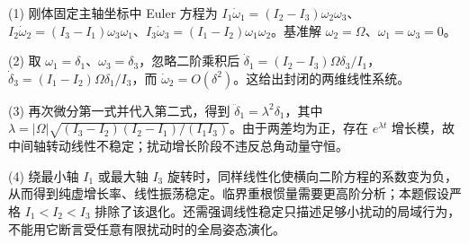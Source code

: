 (1) 刚体固定主轴坐标中 Euler 方程为 $I_1\dot\omega_1=(I_2-I_3)\omega_2\omega_3$、$I_2\dot\omega_2=(I_3-I_1)\omega_3\omega_1$、$I_3\dot\omega_3=(I_1-I_2)\omega_1\omega_2$。基准解 $\omega_2=\Omega$、$\omega_1=\omega_3=0$。

(2) 取 $\omega_1=\delta_1$、$\omega_3=\delta_3$，忽略二阶乘积后 $\dot\delta_1=(I_2-I_3)\Omega\delta_3/I_1$，$\dot\delta_3=(I_1-I_2)\Omega\delta_1/I_3$，而 $\dot\omega_2=O(\delta^2)$。这给出封闭的两维线性系统。

(3) 再次微分第一式并代入第二式，得到 $\ddot\delta_1=\lambda^2\delta_1$，其中 $\lambda=|\Omega|\sqrt{(I_3-I_2)(I_2-I_1)/(I_1I_3)}$。由于两差均为正，存在 $e^{\lambda t}$ 增长模，故中间轴转动线性不稳定；扰动增长阶段不违反总角动量守恒。

(4) 绕最小轴 $I_1$ 或最大轴 $I_3$ 旋转时，同样线性化使横向二阶方程的系数变为负，从而得到纯虚增长率、线性振荡稳定。临界重根惯量需要更高阶分析；本题假设严格 $I_1<I_2<I_3$ 排除了该退化。还需强调线性稳定只描述足够小扰动的局域行为，不能用它断言受任意有限扰动时的全局姿态演化。
